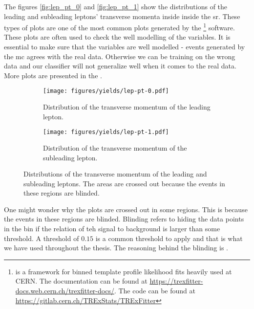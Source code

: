 
\begin{figure}[htb]
    \centering
    
    \label{tab:class_distributions}
\end{figure}


The figures \autoref{fig:lep_pt_0} and \autoref{fig:lep_pt_1} show the distributions of the leading and
subleading leptons' transverse momenta inside inside the \gls{sr}. These types of plots are one of the most common
plots generated by the \trex\footnote{\trex is a framework for binned template profile likelihood fits heavily used at
    CERN. The documentation can be found at \url{https://trexfitter-docs.web.cern.ch/trexfitter-docs/}. The code can be
    found at \url{https://gitlab.cern.ch/TRExStats/TRExFitter}} software. These plots are often used to check the well
modelling of the variables. It is essential to make sure that the variables are well
modelled - events generated by the \gls{mc} agrees with the real data. Otherwise we can be training on the wrong data
and our classifier will not generalize well when it comes to the real data. More plots are presented in the
.


\captionsetup[subfigure]{justification=centering}
\begin{figure}[htb]
    \centering
    \begin{subfigure}{0.45\textwidth}
        \texttt{[image: figures/yields/lep-pt-0.pdf]}
        \caption{Distribution of the transverse momentum of the leading lepton.}
        \label{fig:lep_pt_0}
    \end{subfigure}\hfill%
    \begin{subfigure}{0.45\textwidth}
        \texttt{[image: figures/yields/lep-pt-1.pdf]}
        \caption{Distribution of the transverse momentum of the subleading lepton.}
        \label{fig:lep_pt_1}
    \end{subfigure}
    \caption{Distributions of the transverse momentum of the leading and subleading leptons. The areas are crossed out
        because the events in these regions are blinded.}
\end{figure}

One might wonder why the plots are crossed out in some regions. This is because the events in these regions are blinded.
Blinding refers to hiding the data points in the bin if the relation of teh signal to background is larger than some
threshold. A threshold of $0.15$ is a common threshold to apply and that is what we have used throughout the thesis.
The reasoning behind the blinding is .

